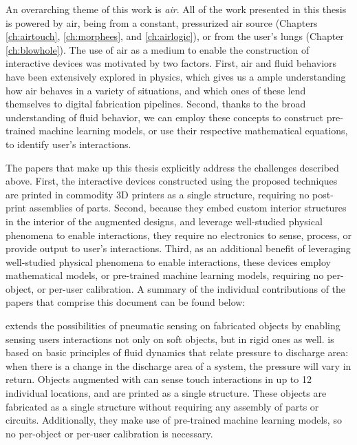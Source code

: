        An overarching theme of this work is \emph{air}. All of the work
        presented in this thesis is powered by air, being from a constant,
        pressurized air source (Chapters \ref{ch:airtouch}, \ref{ch:morphees},
        and \ref{ch:airlogic}), or from the user's lungs (Chapter
        \ref{ch:blowhole}). The use of air as a medium to enable the
        construction of interactive devices was motivated by two factors. First,
        air and fluid behaviors have been extensively explored in physics, which
        gives us a ample understanding how air behaves in a variety of
        situations, and which ones of these lend themselves to digital
        fabrication pipelines. Second, thanks to the broad understanding of
        fluid behavior, we can employ these concepts to construct pre-trained
        machine learning models, or use their respective mathematical equations,
        to identify user's interactions.
        
        The papers that make up this thesis explicitly address the challenges
        described above. First, the interactive devices constructed using the
        proposed techniques are printed in commodity 3D printers as a single
        structure, requiring no post-print assemblies of parts. Second, because
        they embed custom interior structures in the interior of the augmented
        designs, and leverage well-studied physical phenomena to enable
        interactions, they require no electronics to sense, process, or provide
        output to user's interactions. Third, as an additional benefit of
        leveraging well-studied physical phenomena to enable interactions, these
        devices employ mathematical models, or pre-trained machine learning
        models, requiring no per-object, or per-user calibration. A summary of
        the individual contributions of the papers that comprise this document
        can be found below:

        \textsc{\at} extends the possibilities of pneumatic sensing on
        fabricated objects by enabling sensing users interactions not only on
        soft objects, but in rigid ones as well. \emph{\at} is based on basic
        principles of fluid dynamics that relate pressure to discharge area:
        when there is a change in the discharge area of a system, the pressure
        will vary in return. Objects augmented with \emph{\at} can sense touch
        interactions in up to 12 individual locations, and are printed as a
        single structure. These objects are fabricated as a single structure
        without requiring any assembly of parts or circuits. Additionally, they
        make use of pre-trained machine learning models, so no per-object or
        per-user calibration is necessary.
        
